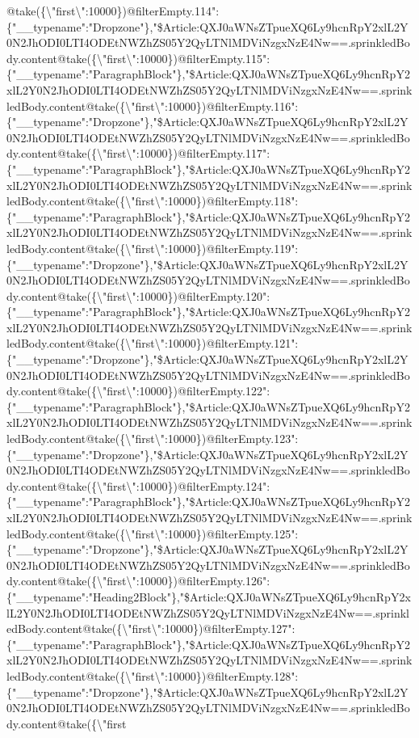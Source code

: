 @take(\{\textbackslash{}"first\textbackslash{}":10000\})@filterEmpty.114":\{"\_\_typename":"Dropzone"\},"\$Article:QXJ0aWNsZTpueXQ6Ly9hcnRpY2xlL2Y0N2JhODI0LTI4ODEtNWZhZS05Y2QyLTNlMDViNzgxNzE4Nw==.sprinkledBody.content@take(\{\textbackslash{}"first\textbackslash{}":10000\})@filterEmpty.115":\{"\_\_typename":"ParagraphBlock"\},"\$Article:QXJ0aWNsZTpueXQ6Ly9hcnRpY2xlL2Y0N2JhODI0LTI4ODEtNWZhZS05Y2QyLTNlMDViNzgxNzE4Nw==.sprinkledBody.content@take(\{\textbackslash{}"first\textbackslash{}":10000\})@filterEmpty.116":\{"\_\_typename":"Dropzone"\},"\$Article:QXJ0aWNsZTpueXQ6Ly9hcnRpY2xlL2Y0N2JhODI0LTI4ODEtNWZhZS05Y2QyLTNlMDViNzgxNzE4Nw==.sprinkledBody.content@take(\{\textbackslash{}"first\textbackslash{}":10000\})@filterEmpty.117":\{"\_\_typename":"ParagraphBlock"\},"\$Article:QXJ0aWNsZTpueXQ6Ly9hcnRpY2xlL2Y0N2JhODI0LTI4ODEtNWZhZS05Y2QyLTNlMDViNzgxNzE4Nw==.sprinkledBody.content@take(\{\textbackslash{}"first\textbackslash{}":10000\})@filterEmpty.118":\{"\_\_typename":"ParagraphBlock"\},"\$Article:QXJ0aWNsZTpueXQ6Ly9hcnRpY2xlL2Y0N2JhODI0LTI4ODEtNWZhZS05Y2QyLTNlMDViNzgxNzE4Nw==.sprinkledBody.content@take(\{\textbackslash{}"first\textbackslash{}":10000\})@filterEmpty.119":\{"\_\_typename":"Dropzone"\},"\$Article:QXJ0aWNsZTpueXQ6Ly9hcnRpY2xlL2Y0N2JhODI0LTI4ODEtNWZhZS05Y2QyLTNlMDViNzgxNzE4Nw==.sprinkledBody.content@take(\{\textbackslash{}"first\textbackslash{}":10000\})@filterEmpty.120":\{"\_\_typename":"ParagraphBlock"\},"\$Article:QXJ0aWNsZTpueXQ6Ly9hcnRpY2xlL2Y0N2JhODI0LTI4ODEtNWZhZS05Y2QyLTNlMDViNzgxNzE4Nw==.sprinkledBody.content@take(\{\textbackslash{}"first\textbackslash{}":10000\})@filterEmpty.121":\{"\_\_typename":"Dropzone"\},"\$Article:QXJ0aWNsZTpueXQ6Ly9hcnRpY2xlL2Y0N2JhODI0LTI4ODEtNWZhZS05Y2QyLTNlMDViNzgxNzE4Nw==.sprinkledBody.content@take(\{\textbackslash{}"first\textbackslash{}":10000\})@filterEmpty.122":\{"\_\_typename":"ParagraphBlock"\},"\$Article:QXJ0aWNsZTpueXQ6Ly9hcnRpY2xlL2Y0N2JhODI0LTI4ODEtNWZhZS05Y2QyLTNlMDViNzgxNzE4Nw==.sprinkledBody.content@take(\{\textbackslash{}"first\textbackslash{}":10000\})@filterEmpty.123":\{"\_\_typename":"Dropzone"\},"\$Article:QXJ0aWNsZTpueXQ6Ly9hcnRpY2xlL2Y0N2JhODI0LTI4ODEtNWZhZS05Y2QyLTNlMDViNzgxNzE4Nw==.sprinkledBody.content@take(\{\textbackslash{}"first\textbackslash{}":10000\})@filterEmpty.124":\{"\_\_typename":"ParagraphBlock"\},"\$Article:QXJ0aWNsZTpueXQ6Ly9hcnRpY2xlL2Y0N2JhODI0LTI4ODEtNWZhZS05Y2QyLTNlMDViNzgxNzE4Nw==.sprinkledBody.content@take(\{\textbackslash{}"first\textbackslash{}":10000\})@filterEmpty.125":\{"\_\_typename":"Dropzone"\},"\$Article:QXJ0aWNsZTpueXQ6Ly9hcnRpY2xlL2Y0N2JhODI0LTI4ODEtNWZhZS05Y2QyLTNlMDViNzgxNzE4Nw==.sprinkledBody.content@take(\{\textbackslash{}"first\textbackslash{}":10000\})@filterEmpty.126":\{"\_\_typename":"Heading2Block"\},"\$Article:QXJ0aWNsZTpueXQ6Ly9hcnRpY2xlL2Y0N2JhODI0LTI4ODEtNWZhZS05Y2QyLTNlMDViNzgxNzE4Nw==.sprinkledBody.content@take(\{\textbackslash{}"first\textbackslash{}":10000\})@filterEmpty.127":\{"\_\_typename":"ParagraphBlock"\},"\$Article:QXJ0aWNsZTpueXQ6Ly9hcnRpY2xlL2Y0N2JhODI0LTI4ODEtNWZhZS05Y2QyLTNlMDViNzgxNzE4Nw==.sprinkledBody.content@take(\{\textbackslash{}"first\textbackslash{}":10000\})@filterEmpty.128":\{"\_\_typename":"Dropzone"\},"\$Article:QXJ0aWNsZTpueXQ6Ly9hcnRpY2xlL2Y0N2JhODI0LTI4ODEtNWZhZS05Y2QyLTNlMDViNzgxNzE4Nw==.sprinkledBody.content@take(\{\textbackslash{}"first\tex